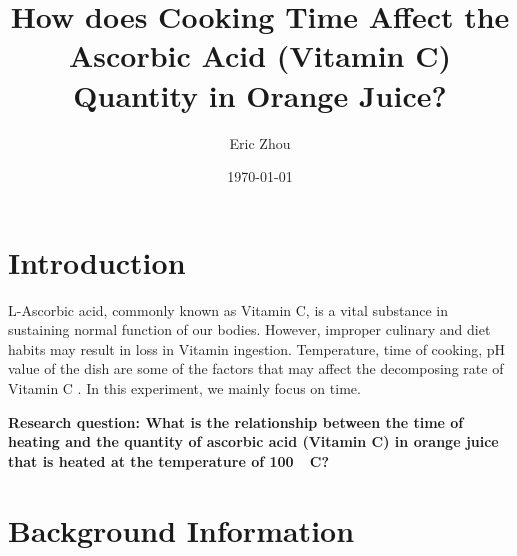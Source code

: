 \documentclass[a4paper]{article}
\begin{document}
\begin{titlepage}
    \title{\textbf{How does Cooking Time Affect the Ascorbic Acid (Vitamin C) Quantity in Orange Juice?} }
    \author{Eric Zhou}
    \date{\today}
    \maketitle
\end{titlepage}


\section{Introduction}

L-Ascorbic acid, commonly known as Vitamin C, is a vital substance in sustaining normal function of our bodies. However, improper culinary and diet habits may result in loss in Vitamin ingestion. Temperature, time of cooking, pH value of the dish are some of the factors that may affect the decomposing rate of Vitamin C \cite{VCDecomp}. In this experiment, we mainly focus on time.

\textbf{Research question: What is the relationship between the time of heating and the quantity of ascorbic acid (Vitamin C) in orange juice that is heated at the temperature of \SI{100}{{}^\circ C}?}

\section{Background Information}




\end{document}
